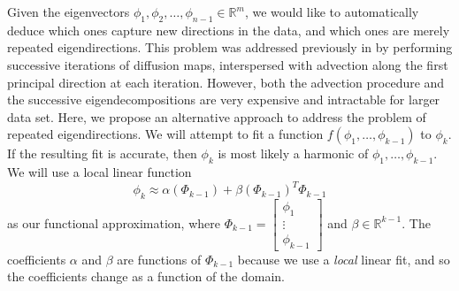 \documentclass[preprint]{elsarticle}
\begin{document}
Given the eigenvectors $\phi_1, \phi_2, \dots, \phi_{n-1} \in \mathbb{R}^m$, we would like to automatically deduce which ones capture new directions in the data, and which ones are merely repeated eigendirections. 
%
This problem was addressed previously in \cite{...} by performing successive iterations of diffusion maps, interspersed with advection along the first principal direction at each iteration. 
%
However, both the advection procedure and the successive eigendecompositions are very expensive and intractable for larger data set. 
%
Here, we propose an alternative approach to address the problem of repeated eigendirections. 
%
We will attempt to fit a function $f(\phi_1, \dots, \phi_{k-1})$ to $\phi_{k}$. 
%
If the resulting fit is accurate, then $\phi_{k}$ is most likely a harmonic of $\phi_1, \dots, \phi_{k-1}$. 
%
We will use a local linear function 
\begin{equation}
\phi_k \approx \alpha( \Phi_{k-1}) + \beta(\Phi_{k-1})^T \Phi_{k-1}
\end{equation}
%
as our functional approximation, where 
%
$\Phi_{k-1} = \begin{bmatrix} \phi_1 \\ \vdots \\ \phi_{k-1} \end{bmatrix}$
and $\beta \in \mathbb{R}^{k-1}$. 
%
The coefficients $\alpha$ and $\beta$ are functions of $\Phi_{k-1}$ because we use a {\em local} linear fit, and so the coefficients change as a function of the domain. 
\end{document}
